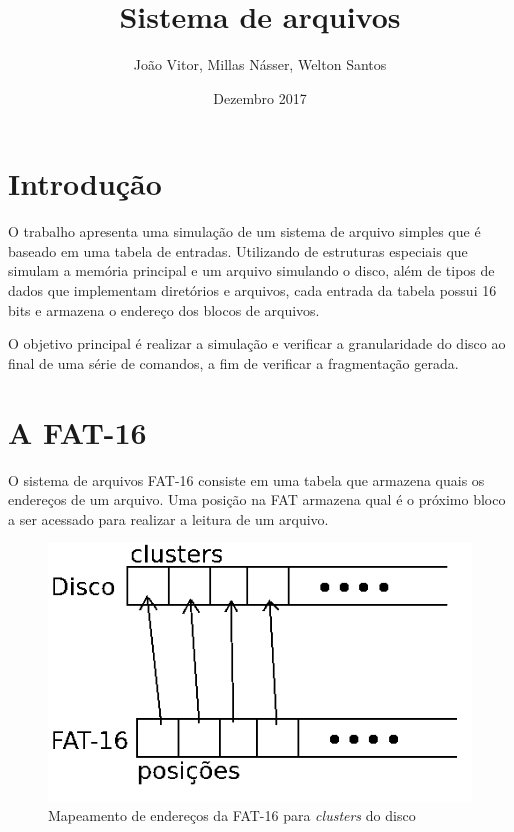 \documentclass{article}
\title{Sistema de arquivos}
\author{João Vitor, Millas Násser, Welton Santos}
\date{Dezembro 2017}
\begin{document}
\maketitle

\section{Introdução}
	O trabalho apresenta uma simulação de um sistema de arquivo simples que é baseado em uma tabela de entradas. Utilizando de estruturas especiais que simulam a memória principal e um arquivo simulando o disco, além de tipos de dados que implementam diretórios e arquivos, cada entrada da tabela possui 16 bits e  armazena o endereço dos blocos de arquivos. 
	
	O objetivo principal é realizar a simulação e verificar a granularidade do disco ao final de uma série de comandos, a fim de verificar a fragmentação gerada.
	
\section{A FAT-16}
	O sistema de arquivos FAT-16 consiste em uma tabela que armazena quais os endereços de um arquivo. Uma posição na FAT armazena qual é o próximo bloco a ser acessado para realizar a leitura de um arquivo.
	
	\begin{figure}[!h]
		\centering
		\includegraphics[scale=0.5]{mapeamentoFatDisco.png}
		\caption{Mapeamento de endereços da FAT-16 para \textit{clusters} do disco}
		\label{fig:fatDisc}
	\end{figure}
\end{document}
